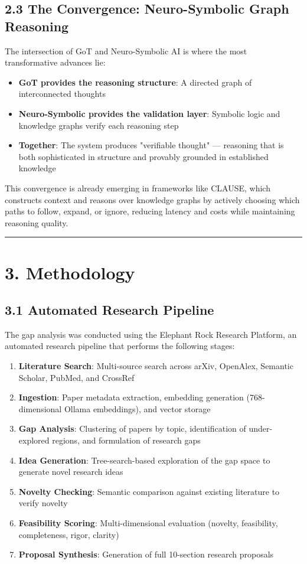 \documentclass[11pt,a4paper]{article}
\begin{document}
\subsection{2.3 The Convergence: Neuro-Symbolic Graph Reasoning}

The intersection of GoT and Neuro-Symbolic AI is where the most transformative advances lie:

\begin{itemize}
  \item \textbf{GoT provides the reasoning structure}: A directed graph of interconnected thoughts
  \item \textbf{Neuro-Symbolic provides the validation layer}: Symbolic logic and knowledge graphs verify each reasoning step
  \item \textbf{Together}: The system produces "verifiable thought" — reasoning that is both sophisticated in structure and provably grounded in established knowledge
\end{itemize}

This convergence is already emerging in frameworks like CLAUSE, which constructs context and reasons over knowledge graphs by actively choosing which paths to follow, expand, or ignore, reducing latency and costs while maintaining reasoning quality.

\noindent\rule{\textwidth}{0.4pt}

\section{3. Methodology}

\subsection{3.1 Automated Research Pipeline}

The gap analysis was conducted using the Elephant Rock Research Platform, an automated research pipeline that performs the following stages:

\begin{enumerate}
  \item \textbf{Literature Search}: Multi-source search across arXiv, OpenAlex, Semantic Scholar, PubMed, and CrossRef
  \item \textbf{Ingestion}: Paper metadata extraction, embedding generation (768-dimensional Ollama embeddings), and vector storage
  \item \textbf{Gap Analysis}: Clustering of papers by topic, identification of under-explored regions, and formulation of research gaps
  \item \textbf{Idea Generation}: Tree-search-based exploration of the gap space to generate novel research ideas
  \item \textbf{Novelty Checking}: Semantic comparison against existing literature to verify novelty
  \item \textbf{Feasibility Scoring}: Multi-dimensional evaluation (novelty, feasibility, completeness, rigor, clarity)
  \item \textbf{Proposal Synthesis}: Generation of full 10-section research proposals
\end{enumerate}
\end{document}
